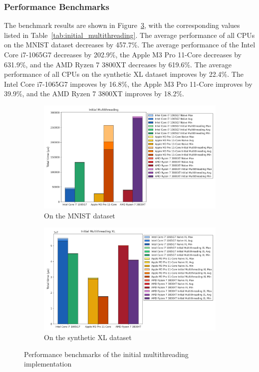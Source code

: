 \documentclass[modern,longauthor]{aastex7}
\begin{document}
\subsubsection{Performance Benchmarks}
The benchmark results are shown in Figure~\ref{fig:initial_multithreading}, with the corresponding values listed in Table~\ref{tab:initial_multithreading}. The average performance of all CPUs on the MNIST dataset decreases by 457.7\%. The average performance of the Intel Core i7-1065G7 decreases by 202.9\%, the Apple M3 Pro 11-Core decreases by 631.9\%, and the AMD Ryzen 7 3800XT decreases by 619.6\%. The average performance of all CPUs on the synthetic XL dataset improves by 22.4\%. The Intel Core i7-1065G7 improves by 16.8\%, the Apple M3 Pro 11-Core improves by 39.9\%, and the AMD Ryzen 7 3800XT improves by 18.2\%.
\begin{figure}[htb!]
\centering
\begin{subfigure}{.5\textwidth}
  \centering
  \includegraphics[width=\linewidth]{Graphs/Initial Multithreading.png}
  \caption{On the MNIST dataset}
 \label{fig:initial_multithreading_mnist}
\end{subfigure}%
\begin{subfigure}{.5\textwidth}
  \centering
  \includegraphics[width=\linewidth]{Graphs/Initial Multithreading XL.png}
  \caption{On the synthetic XL dataset}
 \label{fig:initial_multithreading_xl}
\end{subfigure}
\caption{Performance benchmarks of the initial multithreading implementation}
\label{fig:initial_multithreading}
\end{figure}
\end{document}
